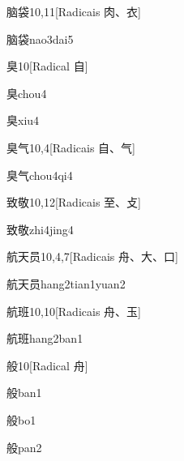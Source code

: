 \begin{entry}{脑袋}{10,11}[Radicais ⾁、⾐]
  \begin{phonetics}{脑袋}{nao3dai5}
  \end{phonetics}
\end{entry}

\begin{entry}{臭}{10}[Radical ⾃]
  \begin{phonetics}{臭}{chou4}
  \end{phonetics}
  \begin{phonetics}{臭}{xiu4}
  \end{phonetics}
\end{entry}

\begin{entry}{臭气}{10,4}[Radicais ⾃、⽓]
  \begin{phonetics}{臭气}{chou4qi4}
  \end{phonetics}
\end{entry}

\begin{entry}{致敬}{10,12}[Radicais ⾄、⽁]
  \begin{phonetics}{致敬}{zhi4jing4}
  \end{phonetics}
\end{entry}

\begin{entry}{航天员}{10,4,7}[Radicais ⾈、⼤、⼝]
  \begin{phonetics}{航天员}{hang2tian1yuan2}
  \end{phonetics}
\end{entry}

\begin{entry}{航班}{10,10}[Radicais ⾈、⽟]
  \begin{phonetics}{航班}{hang2ban1}
  \end{phonetics}
\end{entry}

\begin{entry}{般}{10}[Radical ⾈]
  \begin{phonetics}{般}{ban1}
  \end{phonetics}
  \begin{phonetics}{般}{bo1}
  \end{phonetics}
  \begin{phonetics}{般}{pan2}
  \end{phonetics}
\end{entry}

